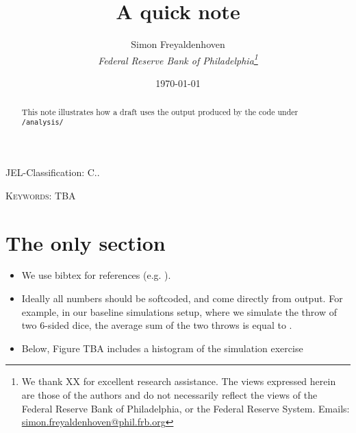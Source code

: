 \documentclass[12pt]{article}
\author{
        Simon Freyaldenhoven\\
        \textit{Federal Reserve Bank of Philadelphia\thanks{We thank XX for excellent research assistance. The views expressed herein are those of the authors and do not necessarily reflect the views of the Federal Reserve Bank of Philadelphia, or the Federal Reserve System. Emails: \href{mailto:simon.freyaldenhoven@phil.frb.org}{simon.freyaldenhoven@phil.frb.org}}}
}
\title{A quick note}
\date{\today}
\theoremstyle{definition}
\begin{document}
\maketitle

\begin{abstract}
\noindent This note illustrates how a draft uses the output produced by the code under \texttt{/analysis/}
\end{abstract}

JEL-Classification: C..

\textsc{Keywords}: TBA

\thispagestyle{empty}
\newpage

\setcounter{page}{1}

\section{The only section}

\begin{itemize}
\item We use bibtex for references (e.g. \cite{Freyaldenhoven2019}). 

\item Ideally all numbers should be softcoded, and come directly from output. For example, in our baseline simulations setup, where we simulate the throw of two 6-sided dice, the average sum of the two throws is equal to \unskip.

\item Below, Figure TBA includes a histogram of the simulation exercise
\end{itemize}




%

\end{document}
